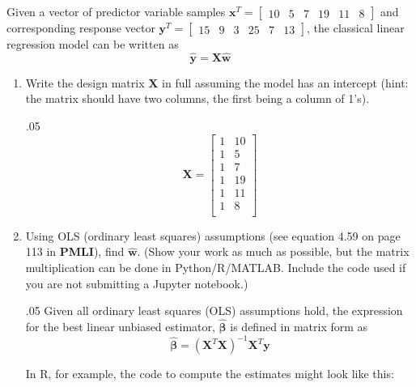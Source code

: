 \documentclass[11pt,twoside]{article}
\newcommand{\pts}[1]{\marginpar{ \small\hspace{0pt} \textit{[#1]} } }
\newcommand{\?}{\stackrel{?}{=}}
\newcommand{\bl}{\color{blue}}
\newenvironment{solution}{\begin{adjustwidth}{.05\textwidth}{}\bl}{\medskip\end{adjustwidth}}
\begin{document}
Given a vector of predictor variable samples $\bm{x}^{T} = \begin{bmatrix} 10 & 5 & 7 & 19 & 11 & 8\end{bmatrix}$
and corresponding response vector $\bm{y}^{T} = \begin{bmatrix}15 & 9 & 3 & 25 & 7 & 13 \end{bmatrix}$, the classical linear regression model can be written as
\begin{equation*}
  \hat{\bm y} = \bm X \hat{\bm w} 
\end{equation*}


\begin{enumerate}[\bf (a)]

\item Write the design matrix $\bm X$ in full assuming the model has an intercept (hint: the matrix should have two
  columns, the first being a column of 1's).  \pts{2}
  \begin{solution}
    \begin{equation*}
      \bm X =
      \begin{bmatrix}
        1 & 10 \\
        1 & 5 \\
        1 & 7 \\
        1 & 19 \\
        1 & 11 \\
        1 & 8 \\
      \end{bmatrix}
    \end{equation*}
   \end{solution}
  
\item Using OLS (ordinary least squares) assumptions (see equation 4.59 on page 113 in \textbf{PMLI}), \pts{4} find $\bm{\hat w}$. (Show your work as much as possible, but the matrix multiplication can be done in Python/R/MATLAB. Include the code used if you are not submitting a Jupyter notebook.) 

  \begin{solution}
    Given all ordinary least squares (OLS) assumptions hold,
    the expression for the best linear unbiased estimator, $\bm{\hat\beta}$ is defined in matrix form as
\begin{equation*}
   \hat{\bm \beta} = (\bm X^{T} \bm X)^{-1}\bm X^{T} \bm y
 \end{equation*}

 In R, for example, the code to compute the estimates might look like this:


\end{solution}
\end{enumerate}
\end{document}
